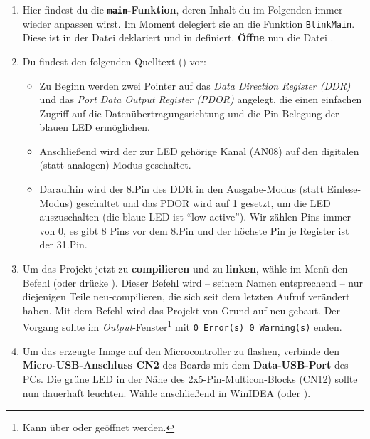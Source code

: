 \begin{enumerate}
\item
Hier findest du die \textbf{\lstinline|main|-Funktion}, deren Inhalt du im Folgenden immer wieder anpassen wirst.
Im Moment delegiert sie an die Funktion \lstinline|BlinkMain|.
Diese ist in der Datei  deklariert und in  definiert.
\textbf{Öffne} nun die Datei \textbf{}.

\item 
Du findest den folgenden Quelltext () vor:
%
\begin{itemize}
\item 
Zu Beginn werden zwei Pointer auf das \emph{Data Direction Register (DDR)} und das \emph{Port Data Output Register (PDOR)} angelegt, die einen einfachen Zugriff auf die Datenübertragungsrichtung und die Pin-Belegung der blauen LED ermöglichen.

\item 
Anschließend wird der zur LED gehörige Kanal (AN08) auf den digitalen (statt analogen) Modus geschaltet.

\item 
Daraufhin wird der 8.\;Pin des DDR in den Ausgabe-Modus (statt Einlese-Modus) geschaltet und das PDOR wird auf 1 gesetzt, um die LED auszuschalten (\dasheisst die blaue LED ist \enquote{low active}).
Wir zählen Pins immer von 0, \dasheisst es gibt 8 Pins vor dem 8.\;Pin und der höchste Pin je Register ist der 31.\;Pin.
\end{itemize}

\item 
Um das Projekt jetzt zu \textbf{compilieren} und zu \textbf{linken}, wähle im Menü  den Befehl  (oder drücke ).
Dieser Befehl wird -- seinem Namen entsprechend -- nur diejenigen Teile neu-compilieren, die sich seit dem letzten Aufruf verändert haben.
Mit dem Befehl  wird das Projekt von Grund auf neu gebaut.
Der Vorgang sollte im \emph{Output}-Fenster\footnote{Kann über  oder  geöffnet werden.} mit \texttt{0 Error(s)  0 Warning(s)} enden.

\item 
Um das erzeugte Image auf den Microcontroller zu flashen, verbinde den \textbf{Micro-USB-Anschluss CN2} des Boards mit dem \textbf{Data-USB-Port} des PCs.
Die grüne LED in der Nähe des 2x5-Pin-Multicon-Blocks (CN12) sollte nun dauerhaft leuchten.
Wähle anschließend in WinIDEA \textbf{} (oder ).



\end{enumerate}

